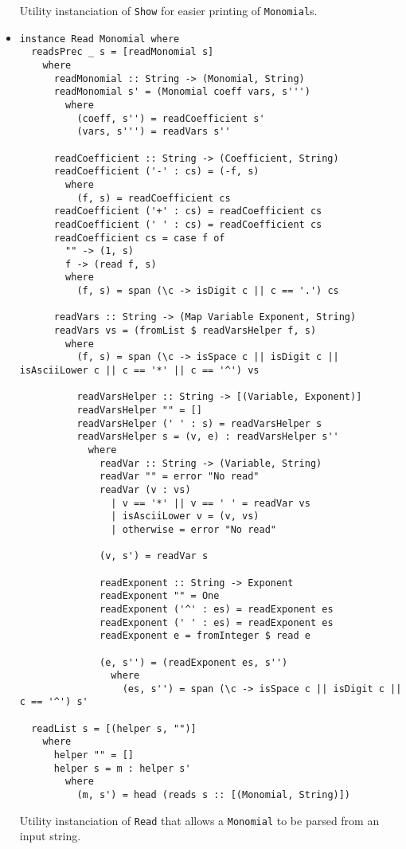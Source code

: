 \documentclass[11pt,a4paper]{article}
\begin{document}
\begin{itemize}
          Utility instanciation of \lstinline{Show} for easier printing of \lstinline{Monomial}s.

    \item \begin{lstlisting}
instance Read Monomial where
  readsPrec _ s = [readMonomial s]
    where
      readMonomial :: String -> (Monomial, String)
      readMonomial s' = (Monomial coeff vars, s''')
        where
          (coeff, s'') = readCoefficient s'
          (vars, s''') = readVars s''

      readCoefficient :: String -> (Coefficient, String)
      readCoefficient ('-' : cs) = (-f, s)
        where
          (f, s) = readCoefficient cs
      readCoefficient ('+' : cs) = readCoefficient cs
      readCoefficient (' ' : cs) = readCoefficient cs
      readCoefficient cs = case f of
        "" -> (1, s)
        f -> (read f, s)
        where
          (f, s) = span (\c -> isDigit c || c == '.') cs

      readVars :: String -> (Map Variable Exponent, String)
      readVars vs = (fromList $ readVarsHelper f, s)
        where
          (f, s) = span (\c -> isSpace c || isDigit c || isAsciiLower c || c == '*' || c == '^') vs

          readVarsHelper :: String -> [(Variable, Exponent)]
          readVarsHelper "" = []
          readVarsHelper (' ' : s) = readVarsHelper s
          readVarsHelper s = (v, e) : readVarsHelper s''
            where
              readVar :: String -> (Variable, String)
              readVar "" = error "No read"
              readVar (v : vs)
                | v == '*' || v == ' ' = readVar vs
                | isAsciiLower v = (v, vs)
                | otherwise = error "No read"

              (v, s') = readVar s

              readExponent :: String -> Exponent
              readExponent "" = One
              readExponent ('^' : es) = readExponent es
              readExponent (' ' : es) = readExponent es
              readExponent e = fromInteger $ read e

              (e, s'') = (readExponent es, s'')
                where
                  (es, s'') = span (\c -> isSpace c || isDigit c || c == '^') s'

  readList s = [(helper s, "")]
    where
      helper "" = []
      helper s = m : helper s'
        where
          (m, s') = head (reads s :: [(Monomial, String)])
    \end{lstlisting}

          Utility instanciation of \lstinline{Read} that allows a \lstinline{Monomial} to be parsed from an input string.

\end{itemize}
\end{document}
